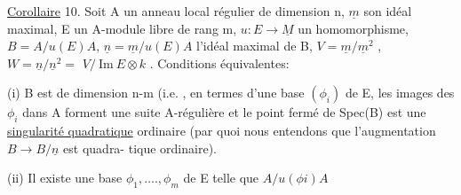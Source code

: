 \uline{Corollaire} 10. Soit A un anneau local régulier de dimension n, $\underline{m}$ son
idéal maximal,  E un A-module libre de rang m, $u{:}E \to \underline{M}$ un homomorphisme,
 $B = A/u(E)A$, $\underline{n} = \underline{m}/u(E)A$ l'idéal maximal de B,
$V = \underline{m}/\underline{m}^2$ , $W = \underline{n}/\underline{n}^2 =$  $V/\ \mathrm{Im}\ E\otimes k$ . Conditions équivalentes:

 (i) B est de dimension n-m (i.e. , en termes d'une base  $(\phi_i)$ de
 E, les images des $\phi_i$ dans A forment une suite A-régulière et  le
 point fermé de Spec(B) est une \uline{singularité quadratique}
ordinaire (par quoi nous entendons que l'augmentation $B\to B/\underline{n}$ est  quadra-%
tique ordinaire).

(ii) Il existe une base $\phi_1 ,\ldots., \phi_m$ de E telle que \hand{\unsure{$\sqrt{\ }$}}$A/$$u(\phi i)A$

